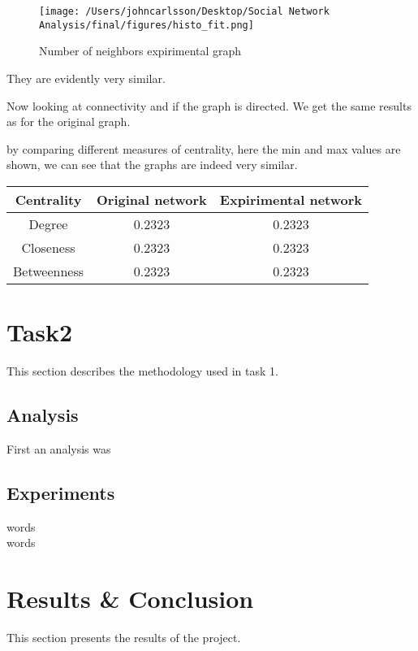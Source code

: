 \documentclass[conference]{IEEEtran}
\begin{document}
\begin{figure}[h]
    \centering
    \caption{Number of neighbors expirimental graph}
\texttt{[image: /Users/johncarlsson/Desktop/Social Network Analysis/final/figures/histo\_fit.png]}
\end{figure}

They are evidently very similar.

Now looking at connectivity and if the graph is directed. We get the same results as for the original graph.

by comparing different measures of centrality, here the min and max values are shown, we can see 
that the graphs are indeed very similar.

\begin{center}
    \begin{tabular}{|c|c|c|}
        
        \hline
        Centrality & Original network & Expirimental network \\
        \hline
        Degree & 0.2323 & 0.2323 \\
        \hline
        Closeness & 0.2323 & 0.2323 \\
        \hline
        Betweenness & 0.2323 & 0.2323 \\
        \hline
    \end{tabular}

\end{center}



\section{Task2}
This section describes the methodology used in task 1.

\subsection{Analysis}
First an analysis was

\subsection{Experiments}
words\\
words

\section{Results & Conclusion}
This section presents the results of the project.
\end{document}
